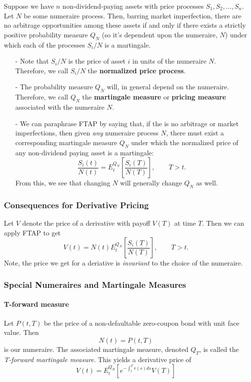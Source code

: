 \documentclass[12pt]{article}
\theoremstyle{plain}
\theoremstyle{definition}
\theoremstyle{remark}
\begin{document}
Suppose we have $n$ non-dividend-paying assets with
price processes $S_1, S_2, \ldots, S_n$.  Let $N$ be some numeraire
process.  Then, barring market imperfection, there are no arbitrage
opportunities among these assets if and only if there exists a strictly
positive probability measure $Q_N$ (so it's dependent upon the numeraire,
$N$) under which each of the processes $S_i / N$ is a martingale.
\begin{itemize}
   \item[-]{Note that $S_i/N$ is the price of asset $i$ in units of the
      numeraire $N$.  Therefore, we call $S_i/N$ the \textbf{normalized
      price process}.}
   \item[-]{The probability measure $Q_N$ will, in general depend on
	 the numeraire.  Therefore, we call $Q_N$ the 
	 \textbf{martingale measure} or \textbf{pricing measure} 
	 associated with the numeraire $N$.} 
   \item[-]{We can paraphrase FTAP by saying that, if the is no arbitrage
	 or market imperfections, then given \emph{any} numeraire 
	 process $N$, there must exist a corresponding martingale
	 measure $Q_N$ under which the normalized price of any 
	 non-dividend paying asset is a martingale:
	    \[ \frac{S_i(t)}{N(t)} = E_t^{Q_N}\left[ \frac{S_i(T)}{N(T)}
	       \right], \qquad T > t. \]
	 From this, we see that changing $N$ will generally change 
	 $Q_N$ as well.
      }
\end{itemize}

\subsubsection{Consequences for Derivative Pricing}

Let $V$ denote the price of a derivative with payoff $V(T)$ at time $T$.
Then we can apply FTAP to get
   \[ V(t) = N(t) E_t^{Q_N} \left[ \frac{S_i(T)}{N(T)}
	       \right], \qquad T > t. \]
Note, the price we get for a deriative is \emph{invariant} to the choice
of the numeraire.

\subsubsection{Special Numeraires and Martingale Measures}

\paragraph{T-forward measure} Let $P(t,T)$ be the price of a
non-defaultable zero-coupon bond with unit face value.  Then
   \[ N(t) = P(t,T) \]
is our numeraire.  The associated martingale measure, denoted 
$Q_T$, is called the \emph{T-forward martingale measure}. This yields
a derivative price of 
   \[ V(t) = E_t^{Q_B} \left[ e^{-\int_t^T r(s) ds} V(T)\right] \]
\end{document}
